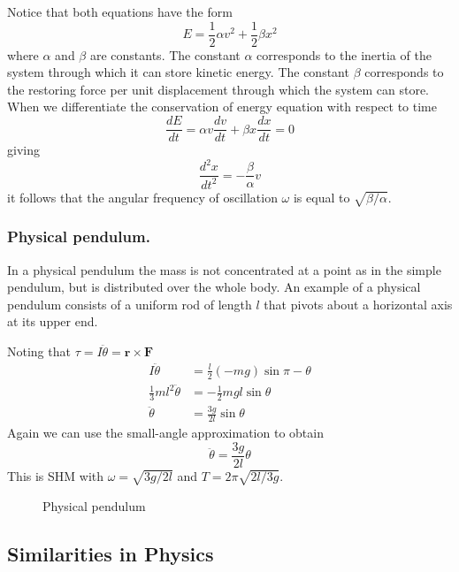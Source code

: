 \documentclass[../../../main.tex]{subfiles}
\begin{document}
Notice that both equations have the form
\begin{equation*}
    E=\frac{1}{2}\alpha v^2+\frac{1}{2}\beta x^2
\end{equation*}
where $\alpha$ and $\beta$ are constants. The constant $\alpha$ corresponds to the inertia of the system through which it can store kinetic energy. The constant $\beta$ corresponds to the restoring force per unit displacement through which the system can store. When we differentiate the conservation of energy equation with respect to time 
\begin{equation*}
    \frac{dE}{dt}=\alpha v\frac{dv}{dt}+\beta x\frac{dx}{dt}=0
\end{equation*}
giving
\begin{equation*}
    \frac{d^2x}{dt^2}=-\frac{\beta}{\alpha}v
\end{equation*}
it follows that the angular frequency of oscillation $\omega$ is equal to $\sqrt{\beta/\alpha}$.

\subsubsection{Physical pendulum.} In a physical pendulum the mass is not concentrated at a point as in the simple pendulum, but is distributed over the whole body. An example of a physical pendulum consists of a uniform rod of length $l$ that pivots about a horizontal axis at its upper end. 

Noting that $\tau=I\ddot{\theta}=\mathbf{r}\times\mathbf{F}$
\begin{align*}
    I\ddot{\theta}&=\frac{l}{2}(-mg)\sin \pi-\theta\\
    \frac{1}{3}ml^2\ddot{\theta}&=-\frac{1}{2}mgl\sin \theta\\
    \ddot{\theta}&=\frac{3g}{2l}\sin\theta
\end{align*}
Again we can use the small-angle approximation to obtain
\begin{equation*}
    \ddot{\theta}=\frac{3g}{2l}\theta
\end{equation*}
This is SHM with $\omega = \sqrt{3g/2l} $ and $T = 2\pi \sqrt{2l/3g}$.
\begin{figure}[h]
    \centering
    \caption*{Physical pendulum}
\end{figure}

\subsection{Similarities in Physics}
\end{document}
